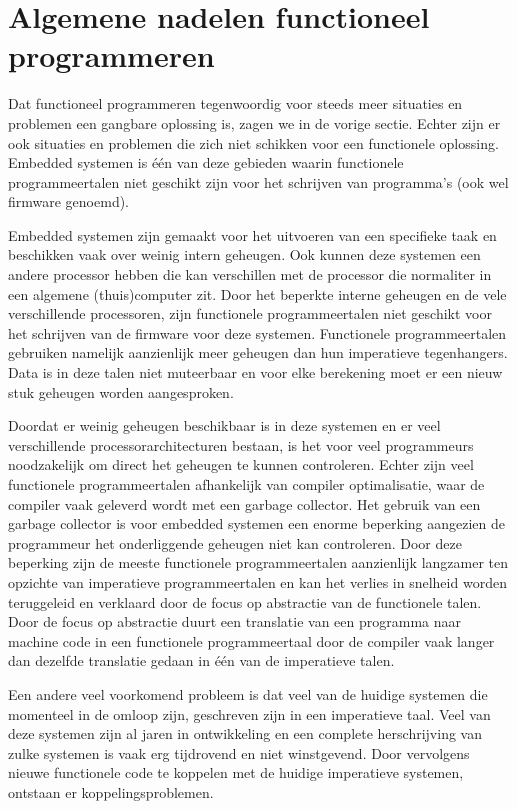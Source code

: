 \documentclass[twoside,twocolumn]{article}
\begin{document}

\section{Algemene nadelen functioneel programmeren}
Dat functioneel programmeren tegenwoordig voor steeds meer situaties en
problemen een gangbare oplossing is, zagen we in de vorige sectie. Echter zijn
er ook situaties en problemen die zich niet schikken voor een functionele
oplossing. Embedded systemen is \'e\'en van deze gebieden waarin functionele
programmeertalen niet geschikt zijn voor het schrijven van programma's
(ook wel firmware genoemd).

Embedded systemen zijn gemaakt voor het uitvoeren van een specifieke taak
en beschikken vaak over weinig intern geheugen. Ook kunnen deze systemen een
andere processor hebben die kan verschillen met de processor die normaliter in
een algemene (thuis)computer zit. Door het beperkte interne geheugen en de vele
verschillende processoren, zijn functionele programmeertalen niet geschikt
voor het schrijven van de firmware voor deze systemen. Functionele
programmeertalen gebruiken namelijk aanzienlijk meer geheugen dan hun
imperatieve tegenhangers. Data is in deze talen niet muteerbaar en voor elke
berekening moet er een nieuw stuk geheugen worden aangesproken.

Doordat er weinig geheugen beschikbaar is in deze systemen en er veel
verschillende processorarchitecturen bestaan, is het voor veel programmeurs
noodzakelijk om direct het geheugen te kunnen controleren. Echter zijn veel
functionele programmeertalen afhankelijk van compiler optimalisatie, waar de
compiler vaak geleverd wordt met een garbage collector. Het gebruik van een
garbage collector is voor embedded systemen een enorme beperking aangezien de
programmeur het onderliggende geheugen niet kan controleren. Door deze
beperking zijn de meeste functionele programmeertalen aanzienlijk langzamer ten
opzichte van imperatieve programmeertalen en kan het verlies in snelheid worden
teruggeleid en verklaard door de focus op abstractie van de functionele talen.
Door de focus op abstractie duurt een translatie van een programma naar machine
code in een functionele programmeertaal door de compiler vaak langer dan
dezelfde translatie gedaan in \'e\'en van de imperatieve talen.

Een andere veel voorkomend probleem is dat veel van de huidige systemen die
momenteel in de omloop zijn, geschreven zijn in een imperatieve taal. Veel van
deze systemen zijn al jaren in ontwikkeling en een complete herschrijving van
zulke systemen is vaak erg tijdrovend en niet winstgevend. Door vervolgens
nieuwe functionele code te koppelen met de huidige imperatieve systemen,
ontstaan er koppelingsproblemen.
\end{document}
